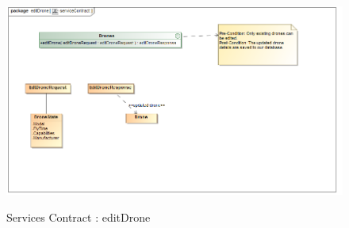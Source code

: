 \documentclass{article}
\begin{document}
		\begin{figure}[H]
			\includegraphics[width=\textwidth]{sc_edit.png}  \\
			\caption{Services Contract : editDrone}
		\end{figure}
\end{document}

